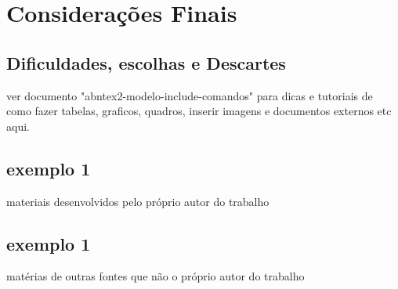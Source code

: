 \documentclass[
12pt,				%
openany,			%
oneside,			%
a4paper,			%
english,			%
french,				%
spanish,			%
brazil				%
]{abntex2}
\begin{document}
	\chapter{Considerações Finais}
	\section{Dificuldades, escolhas e Descartes}
	\cite{ibge1993}
	
	ver documento "abntex2-modelo-include-comandos" para dicas e tutoriais de como fazer tabelas, graficos, quadros, inserir imagens e documentos externos etc aqui. 
	
	\renewcommand{\bibname}{Referências Bibliográficas} %
	
	
	
	
	
	
	
	\begin{apendicesenv}
		
		\partapendices
		
		\chapter{exemplo 1}
		
		materiais desenvolvidos pelo próprio autor do trabalho
		
	\end{apendicesenv}
	
	
	\begin{anexosenv}
		
		\partanexos
		
		\chapter{exemplo 1}
		matérias de outras fontes que não o próprio autor do trabalho
		
	\end{anexosenv}
	
	\printindex
	
\end{document}
